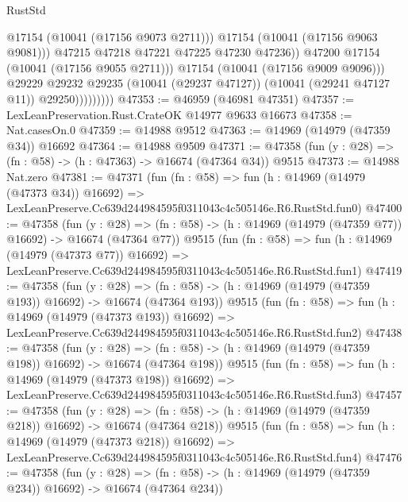 \begin{lexlean}{RustStd}
\begin{coremodule}
                                  @17154
                                  (@10041 (@17156 @9073 @2711)))
                                @17154
                                (@10041 (@17156 @9063 @9081)))
                              @47215
                              @47218
                              @47221
                              @47225
                              @47230
                              @47236))
                          @47200
                          @17154
                          (@10041 (@17156 @9055 @2711)))
                        @17154
                        (@10041 (@17156 @9009 @9096)))
                      @29229
                      @29232
                      @29235
                      (@10041 (@29237 @47127))
                      (@10041 (@29241 @47127 @11))
                      @29250)))))))))
@47353 := @46959 (@46981 @47351)
@47357 := LexLeanPreservation.Rust.CrateOK @14977 @9633 @16673
@47358 := Nat.casesOn.{0}
@47359 := @14988 @9512
@47363 := @14969 (@14979 (@47359 @34)) @16692
@47364 := @14988 @9509
@47371 := @47358 (fun (y : @28) => (fn : @58) -> (h : @47363) -> @16674 (@47364 @34)) @9515
@47373 := @14988 Nat.zero
@47381 := @47371
    (fun (fn : @58) =>
    fun (h : @14969 (@14979 (@47373 @34)) @16692) =>
    LexLeanPreserve.Cc639d244984595f0311043c4c505146e.R6.RustStd.fun0)
@47400 := @47358
    (fun (y : @28) =>
    (fn : @58) -> (h : @14969 (@14979 (@47359 @77)) @16692) -> @16674 (@47364 @77))
    @9515
    (fun (fn : @58) =>
    fun (h : @14969 (@14979 (@47373 @77)) @16692) =>
    LexLeanPreserve.Cc639d244984595f0311043c4c505146e.R6.RustStd.fun1)
@47419 := @47358
    (fun (y : @28) =>
    (fn : @58) -> (h : @14969 (@14979 (@47359 @193)) @16692) -> @16674 (@47364 @193))
    @9515
    (fun (fn : @58) =>
    fun (h : @14969 (@14979 (@47373 @193)) @16692) =>
    LexLeanPreserve.Cc639d244984595f0311043c4c505146e.R6.RustStd.fun2)
@47438 := @47358
    (fun (y : @28) =>
    (fn : @58) -> (h : @14969 (@14979 (@47359 @198)) @16692) -> @16674 (@47364 @198))
    @9515
    (fun (fn : @58) =>
    fun (h : @14969 (@14979 (@47373 @198)) @16692) =>
    LexLeanPreserve.Cc639d244984595f0311043c4c505146e.R6.RustStd.fun3)
@47457 := @47358
    (fun (y : @28) =>
    (fn : @58) -> (h : @14969 (@14979 (@47359 @218)) @16692) -> @16674 (@47364 @218))
    @9515
    (fun (fn : @58) =>
    fun (h : @14969 (@14979 (@47373 @218)) @16692) =>
    LexLeanPreserve.Cc639d244984595f0311043c4c505146e.R6.RustStd.fun4)
@47476 := @47358
    (fun (y : @28) =>
    (fn : @58) -> (h : @14969 (@14979 (@47359 @234)) @16692) -> @16674 (@47364 @234))

\end{coremodule}
\end{lexlean}
